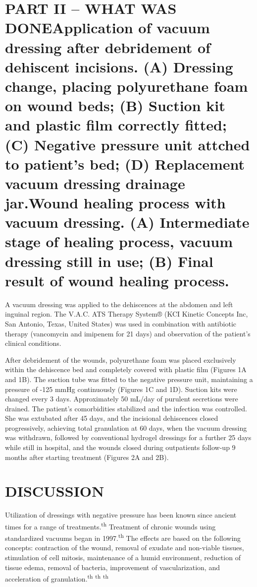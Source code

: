 \documentclass[numberinsection,times,10pt,spreadimages]{memoir}
\begin{document}
\section{PART II – WHAT WAS DONEApplication of vacuum dressing after debridement
of dehiscent
incisions. (A) Dressing change, placing polyurethane foam on wound beds;
(B) Suction kit and plastic film correctly fitted; (C) Negative pressure
unit attched to patient’s bed; (D) Replacement vacuum dressing drainage
jar.Wound healing process with vacuum dressing. (A) Intermediate stage of
healing process, vacuum dressing still in use; (B) Final result of wound
healing process.}

A vacuum dressing was applied to the dehiscences at the abdomen and left
inguinal
region. The V.A.C. ATS Therapy System® (KCI Kinetic Concepts Inc, San Antonio,
Texas, United States) was used in combination with antibiotic therapy
(vancomycin and imipenem for 21 days) and observation of the patient’s clinical
conditions.

After debridement of the wounds, polyurethane foam was placed exclusively within
the dehiscence bed and completely covered with plastic film (Figures 1A and 1B).
The suction tube was fitted to the negative
pressure unit, maintaining a pressure of -125 mmHg continuously (Figures 1C and
1D). Suction kits were changed every 3 days.
Approximately 50 mL/day of purulent secretions were drained. The patient’s
comorbidities stabilized and the infection was controlled. She was extubated
after 45 days, and the incisional dehiscences closed progressively, achieving
total granulation at 60 days, when the vacuum dressing was withdrawn, followed
by conventional hydrogel dressings for a further 25 days while still in
hospital, and the wounds closed during outpatients follow-up 9 months after
starting treatment (Figures 2A and
2B).

\section{DISCUSSION}

Utilization of dressings with negative pressure has been known since ancient
times for a range of treatments.\textsuperscript{th}
Treatment of chronic wounds using standardized vacuums
began in 1997.\textsuperscript{th}
The effects
are based on the following concepts: contraction of the wound, removal of
exudate and non-viable tissues, stimulation of cell mitosis, maintenance of a
humid environment, reduction of tissue edema, removal of bacteria, improvement
of vascularization, and acceleration of granulation.\textsuperscript{th}
\textsuperscript{th}
\textsuperscript{th}
\end{document}
